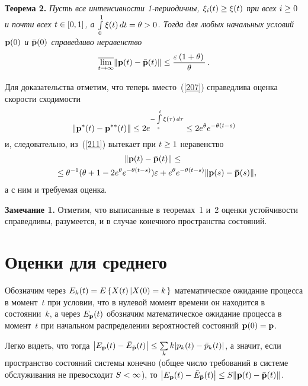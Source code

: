\begin{multicols}{2}
\bigskip

\noindent
\textbf{Теорема 2.} \textit{Пусть все интенсивности 1-пе\-рио\-дич\-ны, 
$\xi_i(t) \hm\ge \xi(t)$ при всех $i \hm\ge 0$ и почти всех $t \hm\in [0,1]$, 
а $\int\limits_0^1 \xi(t) \, dt \hm= \theta \hm> 0$. 
Тогда для любых начальных условий ${\bf p}(0)$ и $\bar{\bf p}(0)$
справедливо неравенство}
\begin{equation*}
\overline{\lim\limits_{t \to \infty}} \|{\bf p}(t) - \bar { \bf p}(t)\| \le
\displaystyle\frac{\displaystyle \varepsilon \left( 1+\theta\right)\mathstrut}{\displaystyle \theta\mathstrut}\,.
\end{equation*}

\medskip
Для доказательства отметим, что теперь вмес\-то~(\ref{207}) справедлива оценка скорости сходимости
\begin{equation*}
\|{\bf p^{*}}(t) - {\bf p^{**}}(t)\| \le   
2e^{-\int\limits_s^t \xi(\tau)\, d\tau} \le 2 e^{\theta}e^{-\theta(t-s)}
\end{equation*}
и, следовательно, из~(\ref{211}) вытекает при $t \hm\ge 1$  неравенство
\begin{multline*}
\|{\bf p}(t)-\bar{\bf p}(t)\| \le{}\\
{}\le 
\theta^{-1}(\theta +1-2 e^{\theta}e^{-\theta(t-s)})\varepsilon 
+ e^{\theta}e^{-\theta(t-s)} \|{\bf p}(s)-{\bf \bar{p}}(s)\|,\hspace*{-4.68616pt}
\end{multline*}
а с ним и требуемая оценка.

\medskip

\noindent
\textbf{Замечание 1.} Отметим, что выписанные в теоремах~1 и~2 
оценки устойчивости справедливы, разумеется, и в случае конечного пространства состояний.

\section{Оценки для среднего}

Обозначим через $E_k(t) \hm= E\left\{X(t)\left|X(0)\hm=k\right.\right\}$ 
математическое ожидание процесса в момент~$t$ при условии, что в нулевой 
момент времени он находится в состоянии~$k$, а через $E_{\bf p}(t)$ обозначим 
математическое ожидание процесса в момент~$t$ при начальном распределении 
вероятностей состояний ${\bf p}(0) = {\bf p}$.

\medskip

Легко видеть, что тогда $\left|E_{\bf p}(t)\hm- \bar{E}_{\bf
\bar{p}}(t)\right| \hm\le \sum\limits_k k|p_k(t)-\bar{p}_k(t)|$, а значит,
если пространство состояний системы конечно (общее число требований
в системе обслуживания не превосходит $S \hm< \infty$), то
$\left|E_{\bf p}(t)\hm- \bar{E}_{\bf \bar{p}}(t)\right| \hm\le S\|{\bf
p}(t)-\bar{\bf p}(t)\|$.


\end{multicols}
